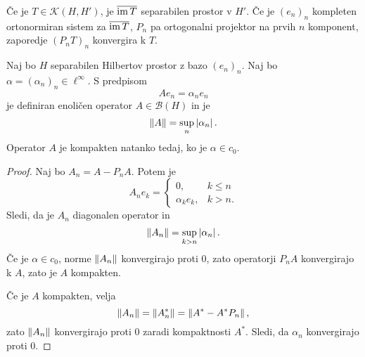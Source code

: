 \begin{posledica}
Če je $T \in \mathcal{K}(H,H')$, je $\overline{\operatorname{im} T}$ separabilen
prostor v $H'$. Če je $(e_n)_n$ kompleten ortonormiran sistem za
$\overline{\operatorname{im} T}$, $P_n$ pa ortogonalni projektor na prvih $n$
komponent, zaporedje $(P_nT)_n$ konvergira k $T$.
\end{posledica}

\begin{zgled}
Naj bo $H$ separabilen Hilbertov prostor z bazo $(e_n)_n$. Naj bo
$\alpha = (\alpha_n)_n \in \ell^\infty$. S predpisom
\[
Ae_n = \alpha_n e_n
\]
je definiran enoličen operator $A \in \mathcal{B}(H)$ in je
\[
\left\lVert A\right\rVert = \sup_n \left\lvert \alpha_n\right\rvert.
\]
Operator $A$ je kompakten natanko tedaj, ko je $\alpha \in c_0$.
\end{zgled}

\begin{proof}
Naj bo $A_n = A - P_n A$. Potem je
\[
A_n e_k =
\begin{cases}
0,            & k \leq n \\
\alpha_k e_k, & k > n.
\end{cases}
\]
Sledi, da je $A_n$ diagonalen operator in
\[
\left\lVert A_n\right\rVert = \sup_{k > n} \left\lvert \alpha_n\right\rvert.
\]
Če je $\alpha \in c_0$, norme $\left\lVert A_n\right\rVert$ konvergirajo proti $0$,
zato operatorji $P_n A$ konvergirajo k $A$, zato je $A$ kompakten.

Če je $A$ kompakten, velja
\[
\left\lVert A_n\right\rVert = \left\lVert A_n^*\right\rVert = \left\lVert A^* - A^* P_n\right\rVert,
\]
zato $\left\lVert A_n\right\rVert$ konvergirajo proti $0$ zaradi kompaktnosti $A^*$.
Sledi, da $\alpha_n$ konvergirajo proti $0$.
\end{proof}
